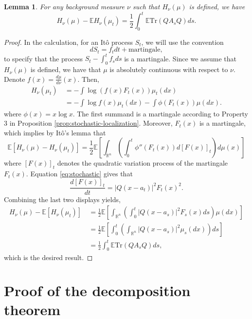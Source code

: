 \documentclass[12pt]{article}
\def \RR {\mathbb R}
\def \Tr {\mathrm{Tr}}
\def \TR {\mathrm{Tr}}
\def \EE {\mathbb E}
\newtheorem{lemma}[theorem]{Lemma}
\theoremstyle{definition}
\theoremstyle{remark}
\begin{document}
\begin{lemma} \label{dHt}
For any background measure $\nu$ such that $H_\nu(\mu)$ is defined, we have
\begin{equation}\label{eq:dHt}
H_\nu(\mu) - \EE H_\nu(\mu_t) = \frac{1}{2} \int_0^t \EE \TR(Q A_s Q) ds.
\end{equation}
\end{lemma}
\begin{proof}
In the calculation, for an It\^{o} process $S_t$, we will use the convention
$$
d S_t = f_t dt + \mathrm{martingale},
$$
to specify that the process $S_t - \int_0^t f_s ds$ is a martingale. Since we assume that $H_\nu(\mu)$ is defined, we have that $\mu$ is absolutely continuous with respect to $\nu$. Denote $f(x) = \frac{d \mu}{d \nu}(x)$. Then,
\begin{align*}
H_\nu (\mu_t) ~& = - \int \log (f(x) F_t(x)) \mu_t(dx) \\
& = - \int \log f(x) \mu_t(dx) - \int \phi(F_t(x)) \mu(dx).
\end{align*}
where $\phi(x) = x \log x$. The first summand is a martingale according to Property 3 in Proposition \ref{prop:stochastic-localization}. Moreover, $F_t(x)$ is a martingale, which implies by It\^{o}'s lemma that
$$
\EE \left [ H_\nu(\mu) - H_\nu(\mu_t) \right ] = \frac{1}{2} \EE \left [ \int_{\RR^n} \left ( \int_0^t \phi''(F_t(x)) d [F(x)]_t \right ) d \mu(x) \right ]
$$
where $[F(x)]_t$ denotes the quadratic variation process of the martingale $F_t(x)$. Equation \eqref{eq:stochastic} gives that
$$
\frac{d[F(x)]_t}{dt} =  |Q(x-a_t)|^2 F_t(x)^2.
$$
Combining the last two displays yields,
\begin{align*}
H_\nu(\mu) - \EE \left [H_\nu(\mu_t) \right ] ~& = \frac{1}{2} \EE \left [ \int_{\RR^n} \left ( \int_0^t |Q(x-a_s)|^2 F_s(x) ds \right ) \mu(dx)  \right ] \\
& = \frac{1}{2} \EE \left [ \int_0^t \left ( \int_{\RR^n}  |Q(x-a_s)|^2 \mu_s(dx) \right  ) ds \right ] \\
& = \frac{1}{2} \int_0^t \EE \Tr(Q A_s Q) ds,
\end{align*}
which is the desired result.
\end{proof}

\section{Proof of the decomposition theorem}
\end{document}
